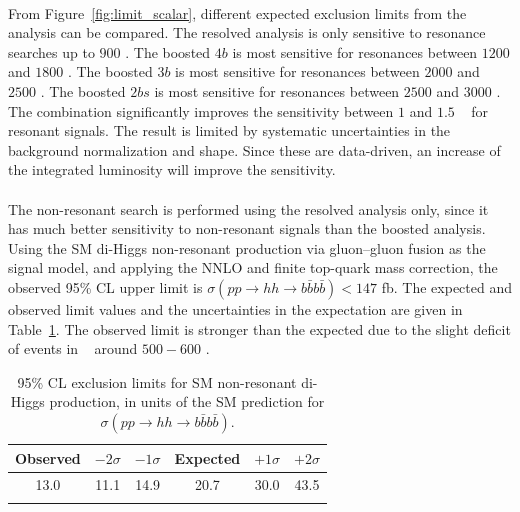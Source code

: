 \paragraph{}
From Figure~\ref{fig:limit_scalar}, different expected exclusion limits from the analysis can be compared.
The resolved analysis is only sensitive to resonance searches up to $900$ \GeV.
The boosted $4b$ is most sensitive for resonances between $1200$ and $1800$ \GeV.
The boosted $3b$ is most sensitive for resonances between $2000$ and $2500$ \GeV.
The boosted $2bs$ is most sensitive for resonances between $2500$ and $3000$ \GeV.
The combination significantly improves the sensitivity between $1$ and $1.5$ \TeV~ for resonant signals.                                                                                
The result is limited by systematic uncertainties in the background normalization and shape.
Since these are data-driven, an increase of the integrated luminosity will improve the sensitivity.

\paragraph{}
The non-resonant search is performed using the resolved analysis only, since it has much better sensitivity to non-resonant signals than the boosted analysis. 
Using the SM di-Higgs non-resonant production via gluon--gluon fusion as the signal model, and applying the NNLO and finite top-quark mass correction, the observed 95\% CL upper limit is $\sigma(pp\rightarrow hh \rightarrow b\bar{b}b\bar{b}) < 147$ fb. 
The expected and observed limit values and the uncertainties in the expectation are given in Table~\ref{tab:smrwMhhlims}.
The observed limit is stronger than the expected due to the slight deficit of events in \mfourj~ around $500-600$ \GeV.

\begin{table}[htp]
\caption{95\% CL exclusion limits for SM non-resonant di-Higgs production, in units of the SM prediction for ${\sigma(pp\rightarrow hh \rightarrow b\bar{b}b\bar{b})}$.}
\begin{center}
\begin{tabular}{cccccc}
\toprule
Observed & $-2\sigma$ & $-1\sigma$ & Expected & $+1\sigma$ & $+2\sigma$ \\
\midrule
13.0 & 11.1 & 14.9 & 20.7 & 30.0 & 43.5 \\
\bottomrule
\label{tab:smrwMhhlims}
\end{tabular}
\end{center}
\end{table}

